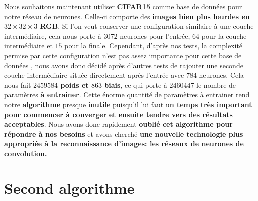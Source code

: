\documentclass[12pt,a4paper]{extarticle}
\begin{document}
Nous souhaitons maintenant utiliser \textbf{CIFAR15} comme base de données pour notre réseau de neurones. Celle-ci comporte des \textbf{images bien plus lourdes en $32\times32\times 3$ RGB}. Si l'on veut conserver une configuration similaire à une couche intermédiaire, cela nous porte à $3072$ neurones pour l'entrée, $64$ pour la couche intermédiaire et $15$ pour la finale. Cependant, d'après nos tests, la complexité permise par cette configuration n'est pas assez importante pour cette base de données , nous avons donc décidé après d'autres tests de rajouter une seconde couche intermédiaire située directement après l'entrée avec $784$ neurones. Cela nous fait \textbf{$2 459 584$ poids et $863$ biais}, ce qui porte à $2 460 447$ le nombre de paramètres \textbf{à entrainer}. Cette énorme quantité de paramètres à entrainer rend notre \textbf{algorithme} presque \textbf{inutile} puisqu'il lui faut u\textbf{n temps très important pour commencer à converger et ensuite tendre vers des résultats acceptables}. Nous avons donc rapidement \textbf{oublié cet algorithme pour répondre à nos besoins }et avons cherché \textbf{une nouvelle technologie plus appropriée à la reconnaissance d'images: les réseaux de neurones de convolution.} 



\part{Second algorithme}
\end{document}
